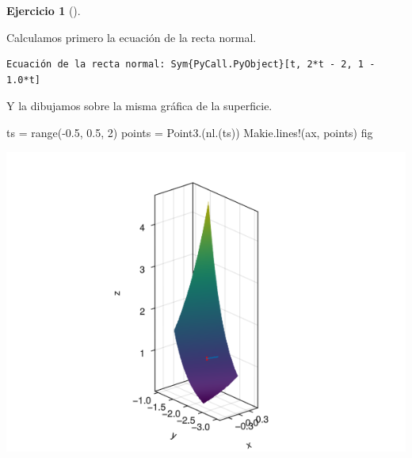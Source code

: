 \documentclass[
  a4paper,
]{scrreport}
\newenvironment{Shaded}{\begin{snugshade}}{\end{snugshade}}
\newcommand{\FloatTok}[1]{\textcolor[rgb]{0.68,0.00,0.00}{#1}}
\newcommand{\FunctionTok}[1]{\textcolor[rgb]{0.28,0.35,0.67}{#1}}
\newcommand{\NormalTok}[1]{\textcolor[rgb]{0.00,0.23,0.31}{#1}}
\newcommand{\OperatorTok}[1]{\textcolor[rgb]{0.37,0.37,0.37}{#1}}
\newcommand{\PreprocessorTok}[1]{\textcolor[rgb]{0.68,0.00,0.00}{#1}}
\newcommand{\SpecialCharTok}[1]{\textcolor[rgb]{0.37,0.37,0.37}{#1}}
\newcommand{\StringTok}[1]{\textcolor[rgb]{0.13,0.47,0.30}{#1}}
\theoremstyle{definition}
\newtheorem{exercise}{Ejercicio}[chapter]
\theoremstyle{remark}
\begin{document}
\begin{exercise}[]
\begin{tcolorbox}
Calculamos primero la ecuación de la recta normal.

\begin{Shaded}
\end{Shaded}

\begin{verbatim}
Ecuación de la recta normal: Sym{PyCall.PyObject}[t, 2*t - 2, 1 - 1.0*t]
\end{verbatim}

Y la dibujamos sobre la misma gráfica de la superficie.

\begin{Shaded}
\begin{Highlighting}[]
\NormalTok{ts }\OperatorTok{=} \FunctionTok{range}\NormalTok{(}\OperatorTok{{-}}\FloatTok{0.5}\NormalTok{, }\FloatTok{0.5}\NormalTok{, }\FloatTok{2}\NormalTok{)}
\NormalTok{points }\OperatorTok{=} \FunctionTok{Point3}\NormalTok{.(}\FunctionTok{nl}\NormalTok{.(ts))}
\NormalTok{Makie.}\FunctionTok{lines!}\NormalTok{(ax, points)}
\NormalTok{fig}
\end{Highlighting}
\end{Shaded}

\includegraphics{09-derivadas-funciones-varias-variables_files/figure-pdf/cell-30-output-1.png}


\end{tcolorbox}
\end{exercise}
\end{document}
